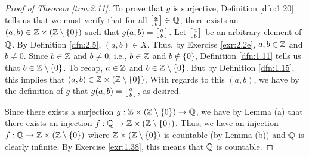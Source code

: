 \documentclass[../main.tex]{subfiles}
\begin{document}
\begin{theorem}
\begin{proof}[Proof of Theorem \ref{trm:2.11}]
        To prove that $g$ is surjective, Definition \ref{dfn:1.20} tells us that we must verify that for all $\left[ \frac{a}{b} \right]\in\mathbb{Q}$, there exists an $(a,b)\in\mathbb{Z}\times(\mathbb{Z}\setminus\{0\})$ such that $g(a,b)=\left[ \frac{a}{b} \right]$. Let $\left[ \frac{a}{b} \right]$ be an arbitrary element of $\mathbb{Q}$. By Definition \ref{dfn:2.5}, $(a,b)\in X$. Thus, by Exercise \ref{exr:2.2e}, $a,b\in\mathbb{Z}$ and $b\neq 0$. Since $b\in\mathbb{Z}$ and $b\neq 0$, i.e., $b\in\mathbb{Z}$ and $b\notin\{0\}$, Definition \ref{dfn:1.11} tells us that $b\in\mathbb{Z}\setminus\{0\}$. To recap, $a\in\mathbb{Z}$ and $b\in\mathbb{Z}\setminus\{0\}$. But by Definition \ref{dfn:1.15}, this implies that $(a,b)\in\mathbb{Z}\times(\mathbb{Z}\setminus\{0\})$. With regards to this $(a,b)$, we have by the definition of $g$ that $g(a,b)=\left[ \frac{a}{b} \right]$, as desired.\par
        Since there exists a surjection $g:\mathbb{Z}\times(\mathbb{Z}\setminus\{0\})\to\mathbb{Q}$, we have by Lemma (a) that there exists an injection $f:\mathbb{Q}\to\mathbb{Z}\times(\mathbb{Z}\setminus\{0\})$. Thus, we have an injection $f:\mathbb{Q}\to\mathbb{Z}\times(\mathbb{Z}\setminus\{0\})$ where $\mathbb{Z}\times(\mathbb{Z}\setminus\{0\})$ is countable (by Lemma (b)) and $\mathbb{Q}$ is clearly infinite. By Exercise \ref{exr:1.38}, this means that $\mathbb{Q}$ is countable.
    \end{proof}
\end{theorem}
\end{document}
